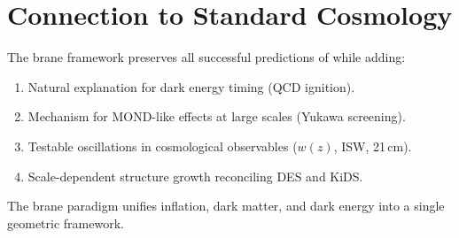 \section{Connection to Standard Cosmology}
\label{sec:connection_standard}

The brane framework preserves all successful predictions of \LCDM{} while adding:
\begin{enumerate}
  \item Natural explanation for dark energy timing (QCD ignition).
  \item Mechanism for MOND-like effects at large scales (Yukawa screening).
  \item Testable oscillations in cosmological observables ($w(z)$, ISW, 21\,cm).
  \item Scale-dependent structure growth reconciling DES and KiDS.
\end{enumerate}

The brane paradigm unifies inflation, dark matter, and dark energy into a single geometric framework.
